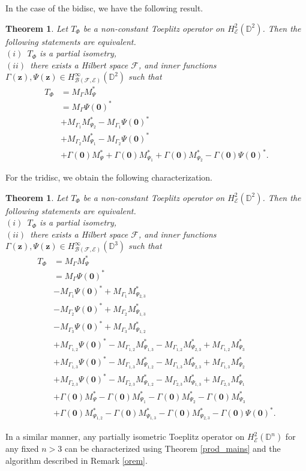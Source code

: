 \documentclass[12pt]{amsart}
\newtheorem{thm}[propn]{Theorem}
\theoremstyle{definition}
\newcommand{\D}{\mathbb{D}}
\newcommand{\1}{{\mbox{\bf 1}}}
\newcommand{\clb}{\mathcal{B}}
\newcommand{\cle}{\mathcal{E}}
\newcommand{\clf}{\mathcal{F}}
\begin{document}
In the case of the bidisc, we have the following result.
\begin{thm}\label{pbidisc}
Let $T_{\Phi}$ be a non-constant Toeplitz operator on $H_{\cle}^2(\D^2)$. Then the following statements are equivalent.\\
$(i)$~$T_{\Phi}$ is a partial isometry,\\
$(ii)$~there exists a Hilbert space $\clf$,  and inner functions $\Gamma(\bm{z}), \Psi(\bm{z}) \in H_{\clb(\clf, \cle)}^{\infty}(\D^2)$ such that
\begin{align*}
T_{\Phi} &= M_{\Gamma}M_{\Psi}^*  \\
&=  M_{\Gamma} \Psi(\bm{0})^*\\
&+M_{\Gamma_1} M_{\Psi_2}^* - M_{\Gamma_1} \Psi(\bm{0})^*\\
&+M_{\Gamma_2} M_{\Psi_1}^*  - M_{\Gamma_2} \Psi(\bm{0})^* \\
& + \Gamma(\bm{0}) M_{\Psi}^* + \Gamma(\bm{0}) M_{\Psi_1}^* + \Gamma(\bm{0}) M_{\Psi_2}^*- \Gamma(\bm{0}) \Psi(\bm{0})^*.
\end{align*}
\end{thm}
For the tridisc, we obtain the following characterization.
\begin{thm}\label{ptridisc}
Let $T_{\Phi}$ be a non-constant Toeplitz operator on $H_{\cle}^2(\D^2)$. Then the following statements are equivalent.\\
$(i)$~$T_{\Phi}$ is a partial isometry,\\
$(ii)$~there exists a Hilbert space $\clf$,  and inner functions $\Gamma(\bm{z}), \Psi(\bm{z}) \in H_{\clb(\clf, \cle)}^{\infty}(\D^3)$ such that
\begin{align*}
T_{\Phi} &= M_{\Gamma}M_{\Psi}^*  \\
&=  M_{\Gamma} \Psi(\bm{0})^*\\
&-M_{\Gamma_1} \Psi(\bm{0})^* + M_{\Gamma_1} M_{\Psi_{2,3}}^*\\
&-M_{\Gamma_2} \Psi(\bm{0})^* + M_{\Gamma_2} M_{\Psi_{1,3}}^*\\
&-M_{\Gamma_3} \Psi(\bm{0})^* + M_{\Gamma_3} M_{\Psi_{1,2}}^*\\
&+M_{\Gamma_{1,2}} \Psi(\bm{0})^*  - M_{\Gamma_{1,2}} M_{\Psi_{1,3}}^* -  M_{\Gamma_{1,2}} M_{\Psi_{2,3}}^* + M_{\Gamma_{1,2}} M_{\Psi_{3}}^*\\
&+M_{\Gamma_{1,3}} \Psi(\bm{0})^*  - M_{\Gamma_{1,3}} M_{\Psi_{1,2}}^* -  M_{\Gamma_{1,3}} M_{\Psi_{2,3}}^* + M_{\Gamma_{1,3}} M_{\Psi_{2}}^*\\
&+M_{\Gamma_{2,3}} \Psi(\bm{0})^*  - M_{\Gamma_{2,3}} M_{\Psi_{1,2}}^* - M_{\Gamma_{2,3}} M_{\Psi_{1,3}}^* + M_{\Gamma_{2,3}} M_{\Psi_1}^* \\
&+\Gamma(\bm{0}) M_{\Psi}^*  - \Gamma(\bm{0}) M_{\Psi_{1}}^* -  \Gamma(\bm{0}) M_{\Psi_{2}}^* - \Gamma(\bm{0}) M_{\Psi_{3}}^*\\
&+\Gamma(\bm{0}) M_{\Psi_{1,2}}^*  - \Gamma(\bm{0}) M_{\Psi_{1,3}}^* -  \Gamma(\bm{0}) M_{\Psi_{2,3}}^* - \Gamma(\bm{0}) \Psi(\bm{0})^*.
\end{align*}
\end{thm}
In a similar manner, any partially isometric Toeplitz operator on $H_{\cle}^2(\D^n)$ for any fixed $n>3$ can be characterized using Theorem \ref{prod_mains} and the algorithm described in Remark \ref{orem}.  
\end{document}
